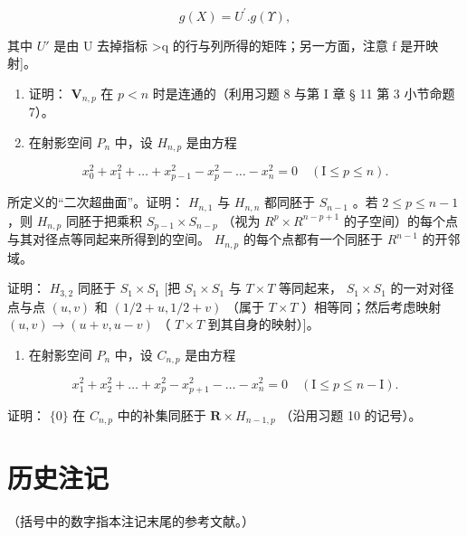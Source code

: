 \[
g (X) = U ^ {\prime}. g (\Upsilon),
\]

其中 \(U'\) 是由 U 去掉指标 \textgreater q 的行与列所得的矩阵；另一方面，注意 f 是开映射{]}。

\begin{enumerate}
\def\labelenumi{\arabic{enumi})}
\setcounter{enumi}{8}
\item
  证明： \(\mathbf{V}_{n,p}\) 在 \(p < n\) 时是连通的（利用习题 8 与第 I 章 § 11 第 3 小节命题 7）。
\item
  在射影空间 \(P_{n}\) 中，设 \(H_{n,p}\) 是由方程
\end{enumerate}

\[
x _ {0} ^ {2} + x _ {1} ^ {2} + \dots + x _ {p - 1} ^ {2} - x _ {p} ^ {2} - \dots - x _ {n} ^ {2} = 0 \quad (\mathrm{I} \leqslant p \leqslant n).
\]

所定义的“二次超曲面”。证明： \(H_{n,1}\) 与 \(H_{n,n}\) 都同胚于 \(S_{n-1}\) 。若 \(2 \leqslant p \leqslant n - 1\) ，则 \(H_{n,p}\) 同胚于把乘积 \(S_{p-1} \times S_{n-p}\) （视为 \(R^{p} \times R^{n-p+1}\) 的子空间）的每个点与其对径点等同起来所得到的空间。 \(H_{n,p}\) 的每个点都有一个同胚于 \(R^{n-1}\) 的开邻域。

证明： \(H_{3,2}\) 同胚于 \(S_{1} \times S_{1}\) {[}把 \(S_{1} \times S_{1}\) 与 \(T \times T\) 等同起来， \(S_{1} \times S_{1}\) 的一对对径点与点 \((u, v)\) 和 \((1/2 + u, 1/2 + v)\) （属于 \(T \times T\) ）相等同；然后考虑映射 \((u, v) \to (u + v, u - v)\) （ \(T \times T\) 到其自身的映射）{]}。

\begin{enumerate}
\def\labelenumi{\arabic{enumi})}
\setcounter{enumi}{10}
\tightlist
\item
  在射影空间 \(P_{n}\) 中，设 \(C_{n,p}\) 是由方程
\end{enumerate}

\[
x _ {1} ^ {2} + x _ {2} ^ {2} + \dots + x _ {p} ^ {2} - x _ {p + 1} ^ {2} - \dots - x _ {n} ^ {2} = 0 \quad (\mathrm{I} \leqslant p \leqslant n - \mathrm{I}).
\]

证明： \(\{0\}\) 在 \(C_{n,p}\) 中的补集同胚于 \(\mathbf{R} \times H_{n-1,p}\) （沿用习题 10 的记号）。

\section*{历史注记}
{}

（括号中的数字指本注记末尾的参考文献。）

